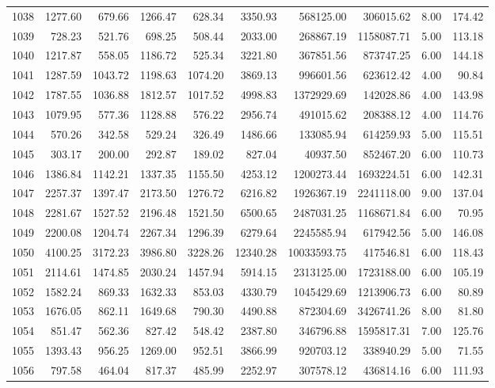 \begin{tabular}{lrrrrrrrrr}
1038 & 1277.60 & 679.66 & 1266.47 & 628.34 & 3350.93 & 568125.00 & 306015.62 & 8.00 & 174.42 \\
1039 & 728.23 & 521.76 & 698.25 & 508.44 & 2033.00 & 268867.19 & 1158087.71 & 5.00 & 113.18 \\
1040 & 1217.87 & 558.05 & 1186.72 & 525.34 & 3221.80 & 367851.56 & 873747.25 & 6.00 & 144.18 \\
1041 & 1287.59 & 1043.72 & 1198.63 & 1074.20 & 3869.13 & 996601.56 & 623612.42 & 4.00 & 90.84 \\
1042 & 1787.55 & 1036.88 & 1812.57 & 1017.52 & 4998.83 & 1372929.69 & 142028.86 & 4.00 & 143.98 \\
1043 & 1079.95 & 577.36 & 1128.88 & 576.22 & 2956.74 & 491015.62 & 208388.12 & 4.00 & 114.76 \\
1044 & 570.26 & 342.58 & 529.24 & 326.49 & 1486.66 & 133085.94 & 614259.93 & 5.00 & 115.51 \\
1045 & 303.17 & 200.00 & 292.87 & 189.02 & 827.04 & 40937.50 & 852467.20 & 6.00 & 110.73 \\
1046 & 1386.84 & 1142.21 & 1337.35 & 1155.50 & 4253.12 & 1200273.44 & 1693224.51 & 6.00 & 142.31 \\
1047 & 2257.37 & 1397.47 & 2173.50 & 1276.72 & 6216.82 & 1926367.19 & 2241118.00 & 9.00 & 137.04 \\
1048 & 2281.67 & 1527.52 & 2196.48 & 1521.50 & 6500.65 & 2487031.25 & 1168671.84 & 6.00 & 70.95 \\
1049 & 2200.08 & 1204.74 & 2267.34 & 1296.39 & 6279.64 & 2245585.94 & 617942.56 & 5.00 & 146.08 \\
1050 & 4100.25 & 3172.23 & 3986.80 & 3228.26 & 12340.28 & 10033593.75 & 417546.81 & 6.00 & 118.43 \\
1051 & 2114.61 & 1474.85 & 2030.24 & 1457.94 & 5914.15 & 2313125.00 & 1723188.00 & 6.00 & 105.19 \\
1052 & 1582.24 & 869.33 & 1632.33 & 853.03 & 4330.79 & 1045429.69 & 1213906.73 & 6.00 & 80.89 \\
1053 & 1676.05 & 862.11 & 1649.68 & 790.30 & 4490.88 & 872304.69 & 3426741.26 & 8.00 & 81.80 \\
1054 & 851.47 & 562.36 & 827.42 & 548.42 & 2387.80 & 346796.88 & 1595817.31 & 7.00 & 125.76 \\
1055 & 1393.43 & 956.25 & 1269.00 & 952.51 & 3866.99 & 920703.12 & 338940.29 & 5.00 & 71.55 \\
1056 & 797.58 & 464.04 & 817.37 & 485.99 & 2252.97 & 307578.12 & 436814.16 & 6.00 & 111.93 \\

\end{tabular}
